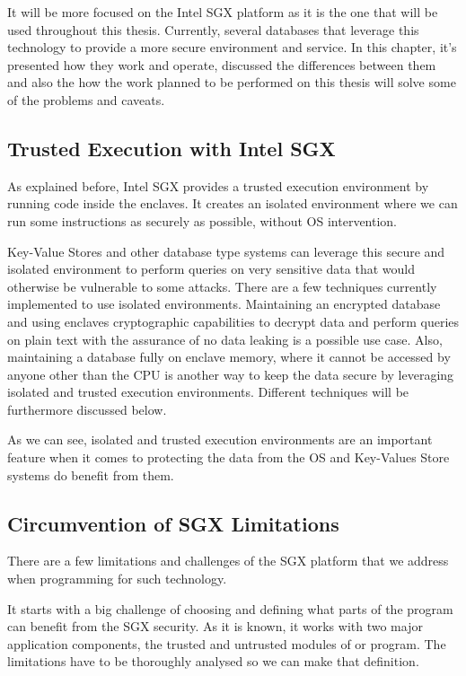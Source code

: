 It will be more focused on the Intel SGX platform as it is the one that will be used throughout this thesis. Currently, several databases that leverage this technology to provide a more secure environment and service. In this chapter, it's presented how they work and operate, discussed the differences between them and also the how the work planned to be performed on this thesis will solve some of the problems and caveats. 

\subsection{Trusted Execution with Intel SGX}
\label{ssec:trusted_execution_with_sgx}

As explained before, Intel SGX provides a trusted execution environment by running code inside the enclaves. It creates an isolated environment where we can run some instructions as securely as possible, without \gls{OS} intervention.

Key-Value Stores and other database type systems can leverage this secure and isolated environment to perform queries on very sensitive data that would otherwise be vulnerable to some attacks. There are a few techniques currently implemented to use isolated environments. Maintaining an encrypted database and using enclaves cryptographic capabilities to decrypt data and perform queries on plain text with the assurance of no data leaking is a possible use case. Also, maintaining a database fully on enclave memory, where it cannot be accessed by anyone other than the CPU is another way to keep the data secure by leveraging isolated and trusted execution environments. Different techniques will be furthermore discussed below. 

As we can see, isolated and trusted execution environments are an important feature when it comes to protecting the data from the \gls{OS} and Key-Values Store systems do benefit from them.

\subsection{Circumvention of SGX Limitations}
\label{ssec:circumvention_of_sgx_limitations}

There are a few limitations and challenges of the SGX platform that we address when programming for such technology.

It starts with a big challenge of choosing and defining what parts of the program can benefit from the \gls{SGX} security. As it is known, it works with two major application components, the trusted and untrusted modules of or program. The limitations have to be thoroughly analysed so we can make that definition.  

